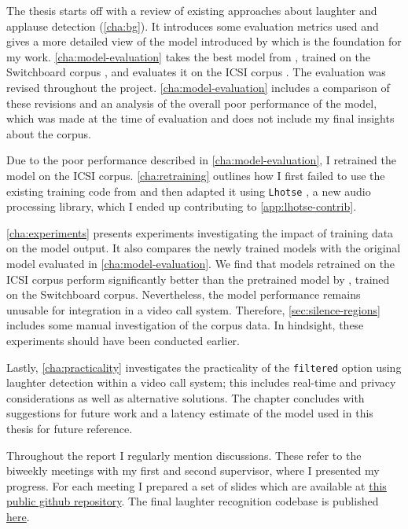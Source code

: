 \documentclass[bsc,frontabs,parskip,deptreport]{infthesis}
\begin{document}
The thesis starts off with a review of existing approaches about laughter and applause detection (\autoref{cha:bg}). It introduces some evaluation metrics used and gives a more detailed view of the model introduced by \citet{gillick2021robust} which is the foundation for my work. \autoref{cha:model-evaluation} takes the best model from \citet{gillick2021robust}, trained on the Switchboard corpus \citep{switchboard-corpus}, and evaluates it on the ICSI corpus \citep{morgan2001meeting}. The evaluation was revised throughout the project. \autoref{cha:model-evaluation} includes a comparison of these revisions and an analysis of the overall poor performance of the model, which was made at the time of evaluation and does not include my final insights about the corpus.

Due to the poor performance described in \autoref{cha:model-evaluation}, I retrained the model on the ICSI corpus. \autoref{cha:retraining} outlines how I first failed to use the existing training code from \citet{gillick2021robust} and then adapted it using \texttt{Lhotse} \citep{zelasko2021lhotse}, a new audio processing library, which I ended up contributing to \autoref{app:lhotse-contrib}.

\autoref{cha:experiments} presents experiments investigating the impact of training data on the model output. It also compares the newly trained models with the original model evaluated in \autoref{cha:model-evaluation}. We find that models retrained on the ICSI corpus perform significantly better than the pretrained model by \citet{gillick2021robust}, trained on the Switchboard corpus. Nevertheless, the model performance remains unusable for integration in a video call system. Therefore, \autoref{sec:silence-regions} includes some manual investigation of the corpus data. In hindsight, these experiments should have been conducted earlier. 

Lastly, \autoref{cha:practicality} investigates the practicality of the \texttt{filtered} option using laughter detection within a video call system; this includes real-time and privacy considerations as well as alternative solutions. The chapter concludes with suggestions for future work and a latency estimate of the model used in this thesis for future reference. 

Throughout the report I regularly mention discussions. These refer to the biweekly meetings with my first and second supervisor, where I presented my progress. For each meeting I prepared a set of slides which are available at \href{https://github.com/LasseWolter/honours-project-21-22/tree/main/Meeting_Notes}{this public github repository}.
The final laughter recognition codebase is published \href{https://github.com/LasseWolter/laughter-detection-icsi}{here}.
\end{document}
